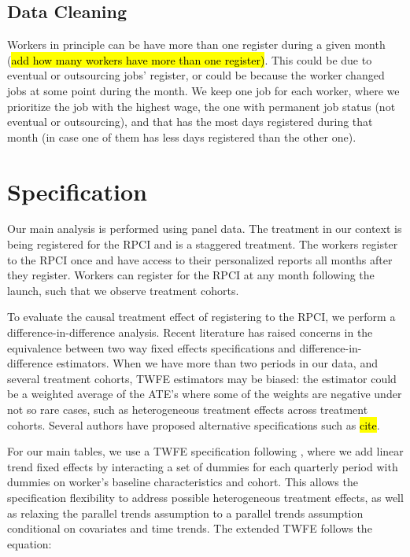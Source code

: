 \documentclass[oneside,11pt]{article}
\begin{document}
\subsection{Data Cleaning}

Workers in principle can be have more than one register during a given month (\hl{add how many workers have more than one register)}. This could be due to eventual or outsourcing jobs' register, or could be because the worker changed jobs at some point during the month. We keep one job for each worker, where we prioritize the job with the highest wage, the one with permanent job status (not eventual or outsourcing), and that has the most days registered during that month (in case one of them has less days registered than the other one).

\section{Specification}

Our main analysis is performed using panel data. The treatment in our context is being registered for the RPCI and is a staggered treatment. The workers register to the RPCI once and have access to their personalized reports all months after they register. Workers can register for the RPCI at any month following the launch, such that we observe treatment cohorts.

To evaluate the causal treatment effect of registering to the RPCI, we perform a difference-in-difference analysis. Recent literature has raised concerns in the equivalence between two way fixed effects specifications and difference-in-difference estimators. When we have more than two periods in our data, and several treatment cohorts, TWFE estimators may be biased: the estimator could be a weighted average of the ATE's where some of the weights are negative under not so rare cases, such as heterogeneous treatment effects across treatment cohorts. Several authors have proposed alternative specifications such as \hl{cite}. 

For our main tables, we use a TWFE specification following \cite{wooldridge2021two}, where we add linear trend fixed effects by interacting a set of dummies for each quarterly period with dummies on worker's baseline characteristics and cohort. This allows the specification flexibility to address possible heterogeneous treatment effects, as well as relaxing the parallel trends assumption to a parallel trends assumption conditional on covariates and time trends. The extended TWFE follows the equation:
\end{document}
